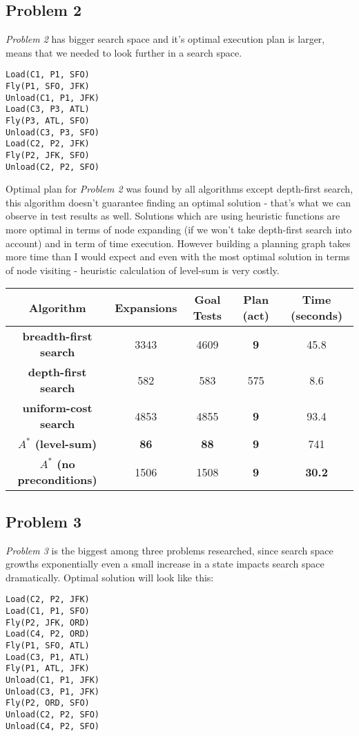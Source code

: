 \documentclass[11pt]{article}
\begin{document}
\subsection{Problem 2}

\textit{Problem 2} has bigger search space and it's optimal execution plan is larger, means that we needed to look further in a search space.
\begin{lstlisting}[frame=single]
Load(C1, P1, SFO)
Fly(P1, SFO, JFK)
Unload(C1, P1, JFK)
Load(C3, P3, ATL)
Fly(P3, ATL, SFO)
Unload(C3, P3, SFO)
Load(C2, P2, JFK)
Fly(P2, JFK, SFO)
Unload(C2, P2, SFO)
\end{lstlisting}

Optimal plan for \textit{Problem 2} was found by all algorithms except depth-first search, this algorithm doesn't guarantee finding an optimal solution - that's what we can observe in test results as well. Solutions which are using heuristic functions are more optimal in terms of node expanding (if we won't take depth-first search into account) and in term of time execution. However building a planning graph takes more time than I would expect and even with the most optimal solution in terms of node visiting - heuristic calculation of level-sum is very costly. 

\begin{center}
 \begin{tabular}{||c c c c c ||} 
 \hline
 Algorithm & Expansions & Goal Tests & Plan (act) & Time (seconds) \\ [0.5ex] 
 \hline\hline
 \textbf{breadth-first search} & 3343 & 4609  & \textbf{9} & 45.8 \\ 
 \hline
 \textbf{depth-first search} & 582 & 583  & 575 & 8.6 \\ 
 \hline
 \textbf{uniform-cost search} & 4853 & 4855  & \textbf{9} & 93.4 \\ 
 \hline
	\textbf{$A^{*}$ (level-sum)} & \textbf{86}	 & \textbf{88} & \textbf{9} & 741 \\ 
 \hline
	\textbf{$A^{*}$ (no preconditions)} & 1506 & 1508 & \textbf{9} & \textbf{30.2}
	 \\ 
 \hline
\end{tabular}
\end{center}

\subsection{Problem 3}

\textit{Problem 3} is the biggest among three problems researched, since search space growths exponentially even a small increase in a state impacts search space dramatically. Optimal solution will look like this: 
\begin{lstlisting}[frame=single]
Load(C2, P2, JFK)
Load(C1, P1, SFO)
Fly(P2, JFK, ORD)
Load(C4, P2, ORD)
Fly(P1, SFO, ATL)
Load(C3, P1, ATL)
Fly(P1, ATL, JFK)
Unload(C1, P1, JFK)
Unload(C3, P1, JFK)
Fly(P2, ORD, SFO)
Unload(C2, P2, SFO)
Unload(C4, P2, SFO)
\end{lstlisting}
\end{document}

